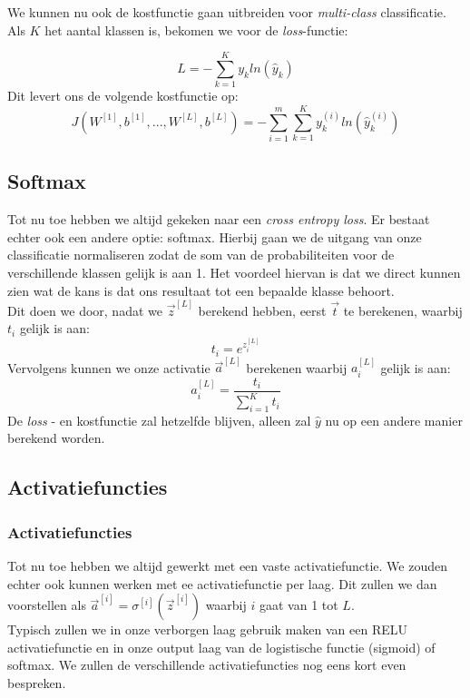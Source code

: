 We kunnen nu ook de kostfunctie gaan uitbreiden voor \textit{multi-class} classificatie. Als $K$ het aantal klassen is, bekomen we voor de \textit{loss}-functie:

\begin{equation}
	L = - \sum_{k=1}^{K} y_{k} ln( \hat{y}_{k})
\end{equation}
\noindent
Dit levert ons de volgende kostfunctie op:
\begin{equation}
	J(W^{[1]}, b^{[1]}, ..., W^{[L]}, b^{[L]}) = - \sum_{i=1}^{m} \sum_{k=1}^{K} y_{k}^{(i)} ln( \hat{y}_{k}^{(i)})
\end{equation}

\subsection{Softmax}

Tot nu toe hebben we altijd gekeken naar een \textit{cross entropy loss}. Er bestaat echter ook een andere optie: softmax. Hierbij gaan we de uitgang van onze classificatie normaliseren zodat de som van de probabiliteiten voor de verschillende klassen gelijk is aan 1. Het voordeel hiervan is dat we direct kunnen zien wat de kans is dat ons resultaat tot een bepaalde klasse behoort.\\
\newline
Dit doen we door, nadat we $\vec{z}^{[L]}$ berekend hebben, eerst $\vec{t}$ te berekenen, waarbij $t_{i}$ gelijk is aan:
\begin{equation}
	t_{i} = e^{z_{i}^{[L]}}
\end{equation}
\noindent
Vervolgens kunnen we onze activatie $\vec{a}^{[L]}$ berekenen waarbij $a_{i}^{[L]}$ gelijk is aan:
\begin{equation}
	a_{i}^{[L]} = \frac{t_{i}}{\sum_{i=1}^{K} t_{i}}
\end{equation}
\noindent
De \textit{loss} - en kostfunctie zal hetzelfde blijven, alleen zal $\hat{y}$ nu op een andere manier berekend worden. 

\subsection{Activatiefuncties}

\subsubsection{Activatiefuncties}

Tot nu toe hebben we altijd gewerkt met een vaste activatiefunctie. We zouden echter ook kunnen werken met ee activatiefunctie per laag. Dit zullen we dan voorstellen als $\vec{a}^{[i]} = \sigma^{[i]}(\vec{z}^{[i]})$ waarbij $i$ gaat van 1 tot $L$. \\
\newline
Typisch zullen we in onze verborgen laag gebruik maken van een RELU activatiefunctie en in onze output laag van de logistische functie (sigmoid) of softmax. We zullen de verschillende activatiefuncties nog eens kort even bespreken.

